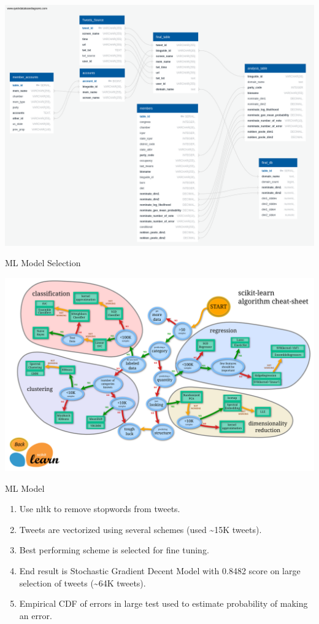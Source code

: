 \documentclass[12pt]{article}
\theoremstyle{example}
\theoremstyle{defn}
\begin{document}
\hspace*{\fill}
\includegraphics[scale=0.13]{QuickDBD-Media_Bias_DB.png}
\hspace*{\fill}

\clearpage

ML Model Selection

\hspace*{\fill}
\includegraphics[scale=0.06]{ml_map.png}
\hspace*{\fill}

\clearpage

ML Model

\vspace*{-10pt}
\begin{enumerate}
\item Use nltk to remove stopwords from tweets.
\item Tweets are vectorized using several schemes (used {\textasciitilde}15K tweets).
\item Best performing scheme is selected for fine tuning.
\item End result is Stochastic Gradient Decent Model with 0.8482 score on large selection of tweets ({\textasciitilde}64K tweets).
\item Empirical CDF of errors in large test used to estimate probability of making an error.
\end{enumerate}
\end{document}
